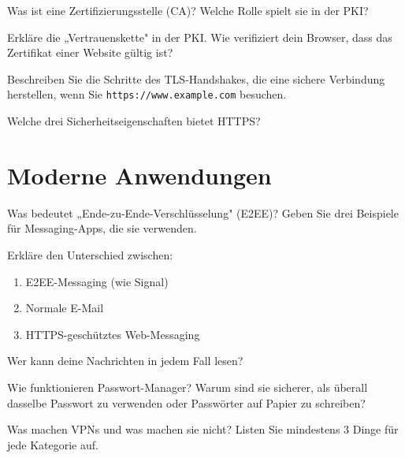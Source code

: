 \documentclass[11pt,a4paper]{report}
\begin{document}
\begin{ex}
Was ist eine Zertifizierungsstelle (CA)? Welche Rolle spielt sie in der PKI?
\end{ex}

\begin{ex}
Erkläre die „Vertrauenskette" in der PKI. Wie verifiziert dein Browser, dass das Zertifikat einer Website gültig ist?
\end{ex}

\begin{ex}
Beschreiben Sie die Schritte des TLS-Handshakes, die eine sichere Verbindung herstellen, wenn Sie \texttt{https://www.example.com} besuchen.
\end{ex}

\begin{ex}
Welche drei Sicherheitseigenschaften bietet HTTPS?
\end{ex}

\section{Moderne Anwendungen}

\begin{ex}
Was bedeutet „Ende-zu-Ende-Verschlüsselung" (E2EE)? Geben Sie drei Beispiele für Messaging-Apps, die sie verwenden.
\end{ex}

\begin{ex}
Erkläre den Unterschied zwischen:
\begin{enumerate}[label=\alph*)]
    \item E2EE-Messaging (wie Signal)
    \item Normale E-Mail
    \item HTTPS-geschütztes Web-Messaging
\end{enumerate}
Wer kann deine Nachrichten in jedem Fall lesen?
\end{ex}

\begin{ex}
Wie funktionieren Passwort-Manager? Warum sind sie sicherer, als überall dasselbe Passwort zu verwenden oder Passwörter auf Papier zu schreiben?
\end{ex}

\begin{ex}
Was machen VPNs und was machen sie nicht? Listen Sie mindestens 3 Dinge für jede Kategorie auf.
\end{ex}
\end{document}
